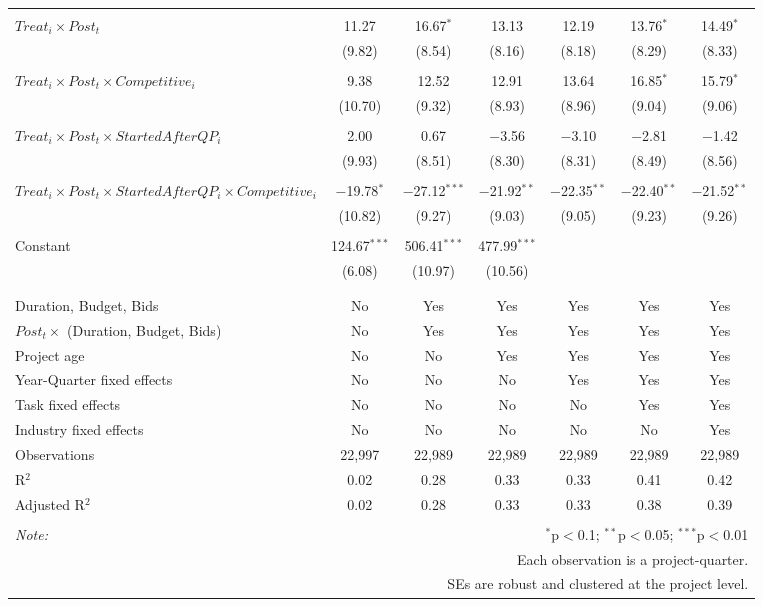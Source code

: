\documentclass[
]{article}
\begin{document}
\begin{table}[H]
\begin{tabular}{@{\extracolsep{-3pt}}lcccccc}
  & & & & & & \\ 
 $Treat_i \times Post_t$ & 11.27 & 16.67$^{*}$ & 13.13 & 12.19 & 13.76$^{*}$ & 14.49$^{*}$ \\ 
  & (9.82) & (8.54) & (8.16) & (8.18) & (8.29) & (8.33) \\ 
  & & & & & & \\ 
 $Treat_i \times Post_t \times Competitive_i$ & 9.38 & 12.52 & 12.91 & 13.64 & 16.85$^{*}$ & 15.79$^{*}$ \\ 
  & (10.70) & (9.32) & (8.93) & (8.96) & (9.04) & (9.06) \\ 
  & & & & & & \\ 
 $Treat_i \times Post_t \times StartedAfterQP_i$ & 2.00 & 0.67 & $-$3.56 & $-$3.10 & $-$2.81 & $-$1.42 \\ 
  & (9.93) & (8.51) & (8.30) & (8.31) & (8.49) & (8.56) \\ 
  & & & & & & \\ 
 $Treat_i \times Post_t \times StartedAfterQP_i \times Competitive_i$ & $-$19.78$^{*}$ & $-$27.12$^{***}$ & $-$21.92$^{**}$ & $-$22.35$^{**}$ & $-$22.40$^{**}$ & $-$21.52$^{**}$ \\ 
  & (10.82) & (9.27) & (9.03) & (9.05) & (9.23) & (9.26) \\ 
  & & & & & & \\ 
 Constant & 124.67$^{***}$ & 506.41$^{***}$ & 477.99$^{***}$ &  &  &  \\ 
  & (6.08) & (10.97) & (10.56) &  &  &  \\ 
  & & & & & & \\ 
\hline \\[-1.8ex] 
Duration, Budget, Bids & No & Yes & Yes & Yes & Yes & Yes \\ 
$Post_t \times $  (Duration, Budget, Bids) & No & Yes & Yes & Yes & Yes & Yes \\ 
Project age & No & No & Yes & Yes & Yes & Yes \\ 
Year-Quarter fixed effects & No & No & No & Yes & Yes & Yes \\ 
Task fixed effects & No & No & No & No & Yes & Yes \\ 
Industry fixed effects & No & No & No & No & No & Yes \\ 
Observations & 22,997 & 22,989 & 22,989 & 22,989 & 22,989 & 22,989 \\ 
R$^{2}$ & 0.02 & 0.28 & 0.33 & 0.33 & 0.41 & 0.42 \\ 
Adjusted R$^{2}$ & 0.02 & 0.28 & 0.33 & 0.33 & 0.38 & 0.39 \\ 
\hline 
\hline \\[-1.8ex] 
\textit{Note:}  & \multicolumn{6}{r}{$^{*}$p$<$0.1; $^{**}$p$<$0.05; $^{***}$p$<$0.01} \\ 
 & \multicolumn{6}{r}{Each observation is a project-quarter.} \\ 
 & \multicolumn{6}{r}{SEs are robust and clustered at the project level.} \\ 
\end{tabular} 
\end{table}
\end{document}
